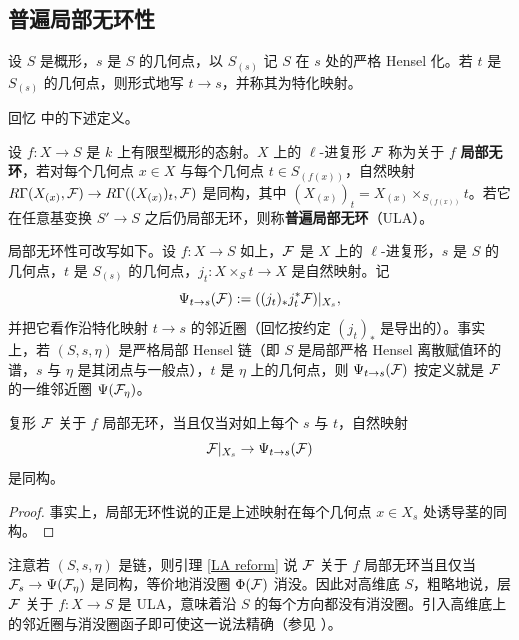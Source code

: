
\subsection{普遍局部无环性}\label{ULA sheaf}

设 $S$ 是概形，$s$ 是 $S$ 的几何点，以 $S_{(s)}$ 记 $S$ 在 $s$ 处的严格 Hensel 化。若 $t$ 是 $S_{(s)}$ 的几何点，则形式地写 $t\to s$，并称其为特化映射。

回忆 \cite{SGA4.5} 中的下述定义。

\begin{dfn}
设 $f:X\to S$ 是 $k$ 上有限型概形的态射。$X$ 上的 $\ell$-进复形 ${\mathcal F}$ 称为关于 $f$ \textbf{局部无环}，若对每个几何点 $x\in X$ 与每个几何点 $t\in S_{(f(x))}$，自然映射 $R\Gamma(X_{(x)},{\mathcal F})\to R\Gamma( (X_{(x)})_t,{\mathcal F})$ 是同构，其中 $(X_{(x)})_t=X_{(x)}\times_{S_{(f(x))}}t$。若它在任意基变换 $S'\to S$ 之后仍局部无环，则称\textbf{普遍局部无环}（ULA）。
\end{dfn}

局部无环性可改写如下。设 $f:X\to S$ 如上，${\mathcal F}$ 是 $X$ 上的 $\ell$-进复形，$s$ 是 $S$ 的几何点，$t$ 是 $S_{(s)}$ 的几何点，$j_t: X\times_{S} t\to X$ 是自然映射。记
\[\Psi_{t\to s}({\mathcal F}):= ((j_t)_*j_t^*{\mathcal F})|_{X_s},\]
并把它看作沿特化映射 $t\to s$ 的邻近圈（回忆按约定 $(j_t)_*$ 是导出的）。事实上，若 $(S,s,\eta)$ 是严格局部 Hensel 链（即 $S$ 是局部严格 Hensel 离散赋值环的谱，$s$ 与 $\eta$ 是其闭点与一般点），$t$ 是 $\eta$ 上的几何点，则 $\Psi_{t\to s}({\mathcal F})$ 按定义就是 ${\mathcal F}$ 的一维邻近圈 $\Psi({\mathcal F}_\eta)$。

\begin{lem}\label{LA reform}
复形 ${\mathcal F}$ 关于 $f$ 局部无环，当且仅当对如上每个 $s$ 与 $t$，自然映射
\begin{equation}\label{sp}
{\mathcal F}|_{X_s}\to \Psi_{t\to s}({\mathcal F})
\end{equation}
是同构。
\end{lem}

\begin{proof}
事实上，局部无环性说的正是上述映射在每个几何点 $x\in X_s$ 处诱导茎的同构。
\end{proof}

\begin{rmk}\label{LA explanation}
注意若 $(S,s,\eta)$ 是链，则引理 \ref{LA reform} 说 ${\mathcal F}$ 关于 $f$ 局部无环当且仅当 ${\mathcal F}_s\to \Psi({\mathcal F}_\eta)$ 是同构，等价地消没圈 $\Phi({\mathcal F})$ 消没。因此对高维底 $S$，粗略地说，层 ${\mathcal F}$ 关于 $f: X\to S$ 是 ULA，意味着沿 $S$ 的每个方向都没有消没圈。引入高维底上的邻近圈与消没圈函子即可使这一说法精确（参见 \cite[Example 1.7(b)]{Il3}）。
\end{rmk}

